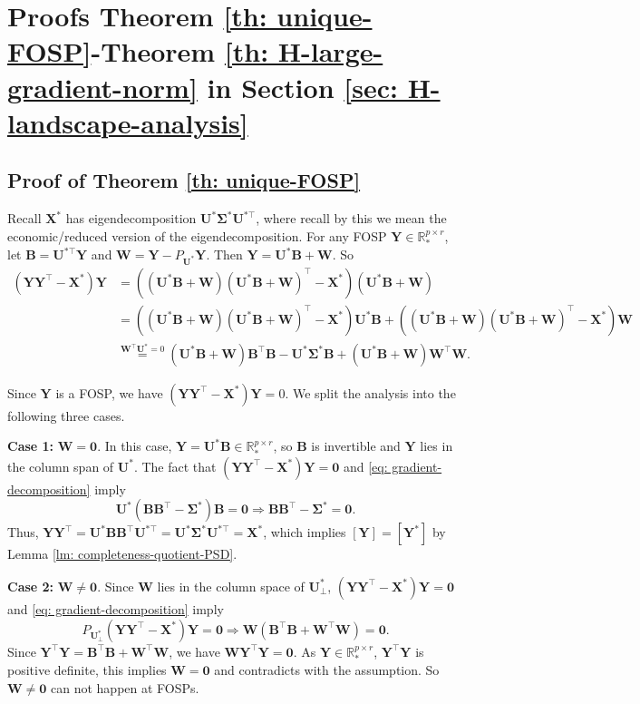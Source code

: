 \documentclass[11pt]{article}
\newcommand{\bbR}{\mathbb{R}}
\newcommand{\0}{{\mathbf{0}}}
\newcommand{\1}{{\mathbf{1}}}
\newcommand{\X}{{\mathbf{X}}}
\newcommand{\B}{{\mathbf{B}}}
\newcommand{\U}{{\mathbf{U}}}
\newcommand{\W}{{\mathbf{W}}}
\newcommand{\Y}{{\mathbf{Y}}}
\newcommand{\bSigma}{\boldsymbol{\Sigma}}
\newcommand{\nc}{\normalcolor}
\begin{document}
\section{Proofs Theorem \ref{th: unique-FOSP}-Theorem \ref{th: H-large-gradient-norm} in Section \ref{sec: H-landscape-analysis}} \label{proof-sec: H-landscape}


\subsection{Proof of Theorem \ref{th: unique-FOSP} }

	Recall $\X^*$ has eigendecomposition $\U^* \bSigma^* \U^{*\top}$, where recall by this we mean the economic/reduced version of the eigendecomposition\nc.  For any FOSP $\Y \in \bbR^{p \times r}_*$, let $\B = \U^{*\top} \Y$ and $\W = \Y - P_{\U^*}\Y$. Then $\Y = \U^* \B + \W $. So
	\begin{equation} \label{eq: gradient-decomposition}
		\begin{split}
			(\Y \Y^\top - \X^*) \Y &=  \left( (\U^* \B + \W)(\U^* \B + \W)^\top - \X^* \right) ( \U^* \B + \W ) \\
			& = \left( (\U^* \B + \W)(\U^* \B + \W)^\top - \X^* \right) \U^* \B+ \left( (\U^* \B + \W)(\U^* \B + \W)^\top - \X^* \right)  \W \\
			& \overset{ \W^\top \U^* = 0 } = ( \U^* \B + \W ) \B^\top \B - \U^* \bSigma^* \B + ( \U^* \B + \W ) \W^\top \W.
		\end{split}
	\end{equation}

Since $\Y$ is a FOSP, we have $(\Y \Y^\top - \X^*) \Y=0$. We split the analysis into the following three cases. \nc


{\bf Case 1: } $\W = \0$. In this case, $\Y = \U^* \B \in \bbR^{p \times r}_*$, so $\B$ is invertible and $\Y$ lies in the column span of $\U^*$. The fact that $(\Y \Y^\top - \X^*) \Y = \0$ and \eqref{eq: gradient-decomposition} imply $$\U^*(\B \B^\top - \bSigma^*) \B = \0 \Longrightarrow \B \B^\top - \bSigma^* = \0.$$
Thus, $\Y \Y^\top = \U^* \B \B^\top \U^{*\top} = \U^* \bSigma^* \U^{*\top} = \X^*$, which implies $[\Y] = [\Y^*]$ by Lemma \ref{lm: completeness-quotient-PSD}.

{\bf Case 2: } $\W \neq \0$. Since $\W$ lies in the column space of $\U^*_\perp$,  $(\Y \Y^\top - \X^*) \Y = \0$ and \eqref{eq: gradient-decomposition} imply $$P_{\U^*_\perp} (\Y \Y^\top - \X^*) \Y = \0 \Longrightarrow \W (\B^\top \B + \W^\top \W)  = \0.$$ Since $\Y^\top \Y = \B^\top \B + \W^\top \W$, we have $\W \Y^\top \Y = \0$. As $\Y \in \bbR^{p \times r}_*$, $\Y^\top \Y$ is positive definite, this implies $\W = \0$ and contradicts with the assumption. So $\W \neq \0$ can not happen at FOSPs.
\end{document}
